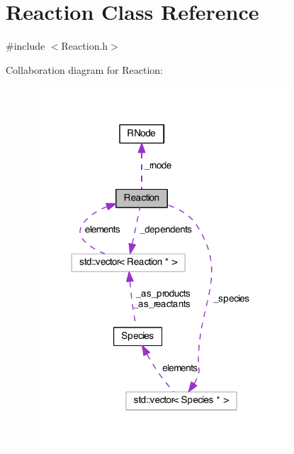 \hypertarget{classReaction}{\section{Reaction Class Reference}
\label{classReaction}
}


{\ttfamily \#include $<$Reaction.\-h$>$}



Collaboration diagram for Reaction\-:\nopagebreak
\begin{figure}[H]
\begin{center}
\leavevmode
\includegraphics[width=269pt]{classReaction__coll__graph}
\end{center}
\end{figure}
